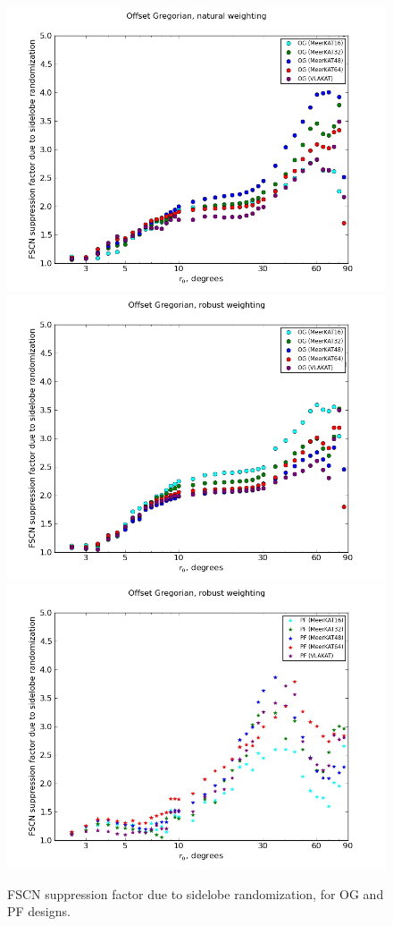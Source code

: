 \documentclass{aa}
\begin{document}
\begin{figure}
\end{figure}

\begin{figure}
  \includegraphics[width=.33\textwidth]{cc-meerkatjes-rrsupp-og-nat}\hfill%
  \includegraphics[width=.33\textwidth]{cc-meerkatjes-rrsupp-og}\hfill%
  \includegraphics[width=.33\textwidth]{cc-meerkatjes-rrsupp-pf}
\caption{\label{fig:fscn-meerkatjes-rr-suppression}FSCN suppression factor due to sidelobe randomization, for OG and PF designs.}

\end{figure}
\end{document}
